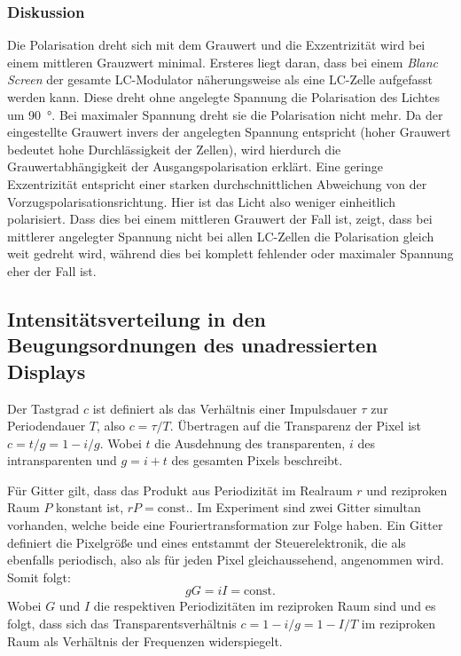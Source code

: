 \documentclass[
	a4paper,
	12pt,
	pagesize,
	ngerman
]{scrartcl}
\begin{document}
			\subsubsection*{Diskussion}
			Die Polarisation dreht sich mit dem Grauwert und die Exzentrizität wird bei einem mittleren Grauzwert minimal.
			Ersteres liegt daran, dass bei einem \textit{Blanc Screen} der gesamte LC-Modulator näherungsweise als eine LC-Zelle aufgefasst werden kann.
			Diese dreht ohne angelegte Spannung die Polarisation des Lichtes um \SI{90}{\degree}.
			Bei maximaler Spannung dreht sie die Polarisation nicht mehr.
			Da der eingestellte Grauwert invers der angelegten Spannung entspricht (hoher Grauwert bedeutet hohe Durchlässigkeit der Zellen), wird hierdurch die Grauwertabhängigkeit der Ausgangspolarisation erklärt.
			Eine geringe Exzentrizität entspricht einer starken durchschnittlichen Abweichung von der Vorzugspolarisationsrichtung.
			Hier ist das Licht also weniger einheitlich polarisiert.
			Dass dies bei einem mittleren Grauwert der Fall ist, zeigt, dass bei mittlerer angelegter Spannung nicht bei allen LC-Zellen die Polarisation gleich weit gedreht wird, während dies bei komplett fehlender oder maximaler Spannung eher der Fall ist.

		\subsection{Intensitätsverteilung in den Beugungsordnungen des unadressierten Displays}


		Der Tastgrad $c$ ist definiert als das Verhältnis einer Impulsdauer $\tau$ zur Periodendauer $T$, also $c=\tau/T$.
		Übertragen auf die Transparenz der Pixel ist $c=t/g=1-i/g$.
		Wobei $t$ die Ausdehnung des transparenten, $i$ des intransparenten und $g=i+t$ des gesamten Pixels beschreibt.


		Für Gitter gilt, dass das Produkt aus Periodizität im Realraum $r$ und reziproken Raum $P$ konstant ist, $rP=\text{const.}$.
		Im Experiment sind zwei Gitter simultan vorhanden, welche beide eine Fouriertransformation zur Folge haben.
		Ein Gitter definiert die Pixelgröße und eines entstammt der Steuerelektronik, die als ebenfalls periodisch, also als für jeden Pixel gleichaussehend, angenommen wird.
		Somit folgt:
		\begin{equation}
			gG =iI = \text{const.}
		\end{equation}
		Wobei $G$ und $I$ die respektiven Periodizitäten im reziproken Raum sind und es folgt, dass sich das Transparentsverhältnis $c=1-i/g=1-I/T$ im reziproken Raum als Verhältnis der Frequenzen widerspiegelt.
\end{document}
